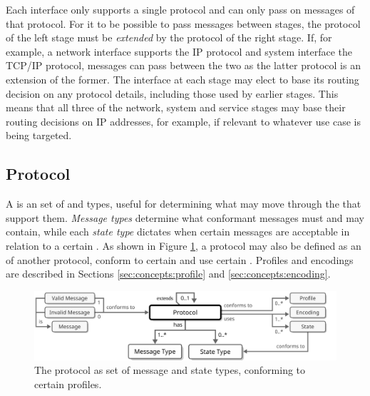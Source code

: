Each interface only supports a single protocol and can only pass on messages of that protocol.
For it to be possible to pass messages between stages, the protocol of the left stage must be \textit{extended} by the protocol of the right stage.
If, for example, a network interface supports the IP protocol \cite{deering2017internet} and system interface the TCP/IP \cite{postel1981transmission} protocol, messages can pass between the two as the latter protocol is an extension of the former.
The interface at each stage may elect to base its routing decision on any protocol details, including those used by earlier stages.
This means that all three of the network, system and service stages may base their routing decisions on IP addresses, for example, if relevant to whatever use case is being targeted.

\subsection{Protocol}
\label{sec:concepts:protocol}

A  is an  set of  and  types, useful for determining what  may move through the  that support them.
\textit{Message types} determine what  conformant messages must and may contain, while each \textit{state type} dictates when certain messages are acceptable in relation to a certain .
As shown in Figure \ref{fig:protocol}, a protocol may also be defined as an  of another protocol, conform to certain  and use certain .
Profiles and encodings are described in Sections \ref{sec:concepts:profile} and \ref{sec:concepts:encoding}.

\vfill

\begin{figure}[ht!]
  \centering
  \includegraphics[scale=0.9]{figures/protocol}
  \caption{
    The protocol as set of message and state types, conforming to certain profiles.
  }
  \label{fig:protocol}
\end{figure}

